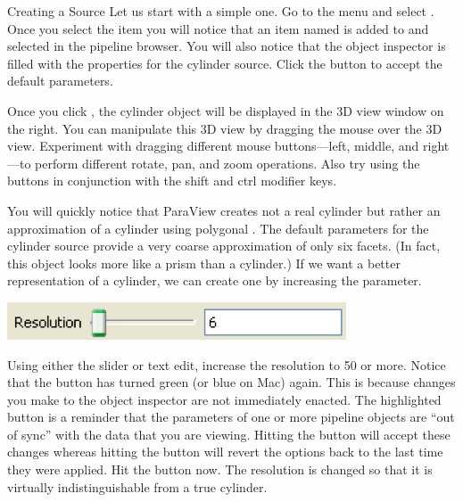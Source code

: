 \begin{exercise}{Creating a Source}
  \label{ex:CreatingASource}%
  Let us start with a simple one.  Go to the  menu and select
  .  Once you select the  item you will notice
  that an item named  is added to and selected in the
  pipeline browser.  You will also notice that the object inspector is
  filled with the properties for the cylinder source.  Click the
   button \apply to accept the default parameters.

  Once you click , the cylinder object will be displayed in the
  3D view window on the right.  You can manipulate this 3D view by dragging
  the mouse over the 3D view.  Experiment with dragging different mouse
  buttons---left, middle, and right---to perform different rotate, pan, and
  zoom operations.  Also try using the buttons in conjunction with the
  shift and ctrl modifier keys.

  You will quickly notice that ParaView creates not a real cylinder but
  rather an approximation of a cylinder using polygonal .
  The default parameters for the cylinder source provide a very coarse
  approximation of only six facets. (In fact, this object looks more like a
  prism than a cylinder.) If we want a better representation of a cylinder,
  we can create one by increasing the  parameter.

  \begin{inlinefig}
    \includegraphics[width=.83\scw]{images/ResolutionParameter}
  \end{inlinefig}

  Using either the slider or text edit, increase the resolution to 50 or
  more.  Notice that the  button \apply has turned green (or
  blue on Mac) again.  This is because changes you make to the object
  inspector are not immediately enacted.  The highlighted button is a
  reminder that the parameters of one or more pipeline objects are ``out of
  sync'' with the data that you are viewing.  Hitting the  button
  will accept these changes whereas hitting the  button \reset
  will revert the options back to the last time they were applied.  Hit the
   button now.  The resolution is changed so that it is
  virtually indistinguishable from a true cylinder.
\end{exercise}

